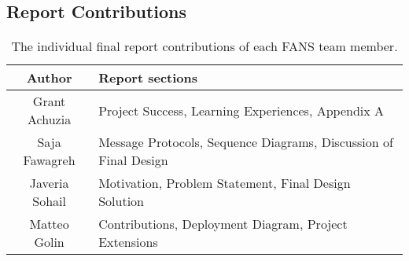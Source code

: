 \subsection{Report Contributions}

\begin{table}[H]
    \centering
    \begin{tabular}{| c | p{5in} |}
        \hline
        Author         & Report sections                                                  \\
        \hline
        Grant Achuzia  & Project Success, Learning Experiences, Appendix A                \\
        \hline
        Saja Fawagreh  & Message Protocols, Sequence Diagrams, Discussion of Final Design \\
        \hline
        Javeria Sohail & Motivation, Problem Statement, Final Design Solution             \\
        \hline
        Matteo Golin   & Contributions, Deployment Diagram, Project Extensions            \\
        \hline
    \end{tabular}
    \caption{The individual final report contributions of each FANS team member.}
\end{table}
